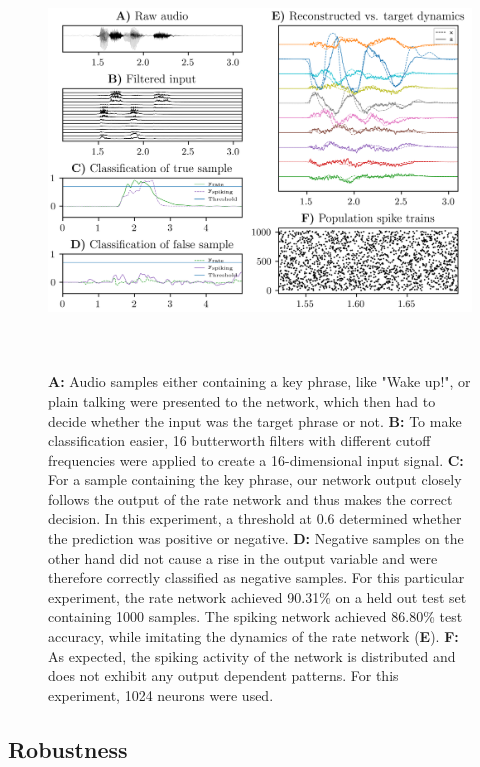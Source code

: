 \documentclass[twoside,11pt,titlepage]{article}
\begin{document}
\begin{figure}[!htb]
  \includegraphics[width = \columnwidth, height=11cm]{figures/figure3.png}
  \caption{\textbf{A:} Audio samples either containing a key phrase, like "Wake up!", or plain talking were
  presented to the network, which then had to decide whether the input was the target phrase or not.
  \textbf{B:} To make classification easier, 16 butterworth filters with different cutoff frequencies
  were applied to create a 16-dimensional input signal. \textbf{C:} For a sample containing the key phrase,
  our network output closely follows the output of the rate network and thus makes the correct decision. In this experiment,
  a threshold at 0.6 determined whether the prediction was positive or negative. \textbf{D:} Negative samples on the other hand
  did not cause a rise in the output variable and were therefore correctly classified as negative samples. For this particular experiment,
  the rate network achieved 90.31\% on a held out test set containing 1000 samples. The spiking network achieved 86.80\% test accuracy,
  while imitating the dynamics of the rate network (\textbf{E}). \textbf{F:} As expected, the spiking activity of the
  network is distributed and does not exhibit any output dependent patterns.
  For this experiment, 1024 neurons were used.}
  \label{fig:figure3}
\end{figure}

\clearpage

\subsection{Robustness}
\end{document}
